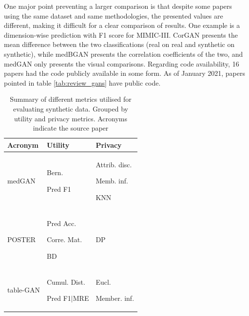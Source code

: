 One major point preventing a larger comparison is that despite some papers using the same dataset and same methodologies, the presented values are different, making it difficult for a clear comparison of results. One example is a dimension-wise prediction with F1 score for MIMIC-III. CorGAN presents the mean difference between the two classifications (real on real and synthetic on synthetic), while medBGAN presents the correlation coefficients of the two, and medGAN only presents the visual comparisons. Regarding code availability, 16 papers had the code publicly available in some form. As of January 2021, papers pointed in table \ref{tab:review_gans} have public code.



\begin{landscape}
\renewcommand{\arraystretch}{1.02} %
\begin{table}[htbp]
\caption{Summary of different metrics utilised for evaluating synthetic data. Grouped by utility and privacy metrics. Acronyms indicate the source paper} \label{tab:results_review} 

\begin{tabular}{p{26mm} p{84mm} p{60mm}}
\hline
Acronym & Utility & Privacy \\
\hline
medGAN	& \begin{enumerate*}
    \item Bern.
    \item Pred F1
\end{enumerate*} & \begin{enumerate*}
\item Attrib. disc. \item Memb. inf. \item KNN	\end{enumerate*}  \\


POSTER &	\begin{enumerate*}
\item Pred Acc.
\item Corre. Mat. \item BD
\end{enumerate*} & DP\\
table-GAN &	\begin{enumerate*}
\item Cumul. Dist.
\item Pred F1$\vert$MRE
 \end{enumerate*} &	\begin{enumerate*} \item Eucl.
\item Member. inf.   \end{enumerate*}  \\


\end{tabular}
\end{table}
\end{landscape}
